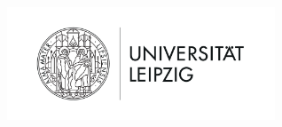 \begin{titlepage}
    \begin{addmargin}[-1cm]{-3cm}
    \begin{center}
        \large

        \hfill

        \vfill

        \begingroup
            \color{CTtitle}\spacedallcaps{\myTitle} \\ \bigskip
        \endgroup

        \spacedlowsmallcaps{\myName}

        \vfill

        \includegraphics[width=8cm]{images/Uni-L.png} \\ \medskip

        \myUni \\ 
        \myFaculty \\ 
        \myDepartment \\\bigskip

        \myTime\ %

        \vfill

    \end{center}
  \end{addmargin}
\end{titlepage}
